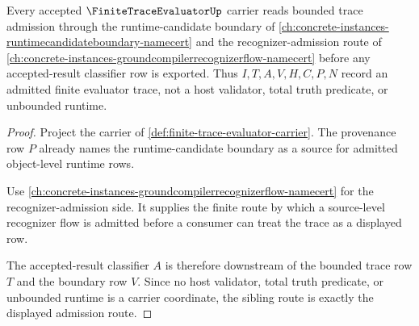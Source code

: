 \begin{theorem}
\label{thm:finite-trace-evaluator-runtime-candidate-sibling-route}
Every accepted $\FiniteTraceEvaluatorUp$ carrier reads bounded trace admission through the runtime-candidate boundary of \autoref{ch:concrete-instances-runtimecandidateboundary-namecert} and the recognizer-admission route of \autoref{ch:concrete-instances-groundcompilerrecognizerflow-namecert} before any accepted-result classifier row is exported. Thus $I,T,A,V,H,C,P,N$ record an admitted finite evaluator trace, not a host validator, total truth predicate, or unbounded runtime.
\end{theorem}
\begin{proof}
Project the carrier of \autoref{def:finite-trace-evaluator-carrier}. The provenance row $P$ already names the runtime-candidate boundary as a source for admitted object-level runtime rows.

Use \autoref{ch:concrete-instances-groundcompilerrecognizerflow-namecert} for the recognizer-admission side. It supplies the finite route by which a source-level recognizer flow is admitted before a consumer can treat the trace as a displayed row.

The accepted-result classifier $A$ is therefore downstream of the bounded trace row $T$ and the boundary row $V$. Since no host validator, total truth predicate, or unbounded runtime is a carrier coordinate, the sibling route is exactly the displayed admission route.
\end{proof}

